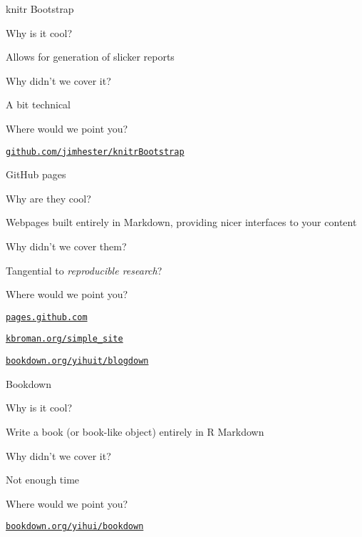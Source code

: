 \documentclass[12pt,t]{beamer}
\begin{document}
\begin{frame}[c]{knitr Bootstrap}

  \bbi
\item[] Why is it cool?
  \bi
\item Allows for generation of slicker reports
  \ei
\item[] Why didn't we cover it?
    \bi
    \item A bit technical
    \ei
\item[] Where would we point you?
    \bi
  \item \href{https://github.com/jimhester/knitrBootstrap}{\tt github.com/jimhester/knitrBootstrap}
   \ei
\ei


\end{frame}



\begin{frame}[c]{GitHub pages}

  \bbi
\item[] Why are they cool?
  \bi
\item Webpages built entirely in Markdown, providing
   nicer interfaces to your content
  \ei
\item[] Why didn't we cover them?
    \bi
    \item Tangential to \emph{reproducible research}?
    \ei
\item[] Where would we point you?
    \bi
  \item \href{https://pages.github.com}{\tt pages.github.com}
  \item \href{http://kbroman.org/simple_site}{\tt kbroman.org/simple\_site}
  \item \href{https://bookdown.org/yihui/blogdown/}{\tt bookdown.org/yihuit/blogdown}
   \ei
\ei


\end{frame}




\begin{frame}[c]{Bookdown}

  \bbi
\item[] Why is it cool?
  \bi
\item Write a book (or book-like object) entirely in R Markdown
  \ei
\item[] Why didn't we cover it?
    \bi
    \item Not enough time
    \ei
\item[] Where would we point you?
    \bi
  \item \href{https://bookdown.org/yihui/bookdown/}{\tt bookdown.org/yihui/bookdown}
   \ei
\ei


\end{frame}
\end{document}
